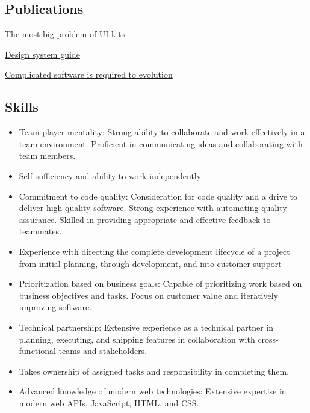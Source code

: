 \documentclass{vitonsky}
\begin{document}
\subsection*{Publications}

\href{https://vitonsky.net/blog/2022/05/23/ui-kit-design/}{The most big problem of UI kits}

\href{https://vitonsky.net/blog/2023/03/18/design-system-guide/}{Design system guide}

\href{https://vitonsky.net/blog/2022/06/08/complicated-software/}{Complicated software is required to evolution}

\subsection*{Skills}

\begin{itemize}
\item
  Team player mentality: Strong ability to collaborate and work effectively in a team environment. Proficient in communicating ideas and collaborating with team members.
\item
  Self-sufficiency and ability to work independently
\item
  Commitment to code quality: Consideration for code quality and a drive to deliver high-quality software. Strong experience with automating quality assurance. Skilled in providing appropriate and effective feedback to teammates.
\item
  Experience with directing the complete development lifecycle of a project from initial planning, through development, and into customer support
\item
  Prioritization based on business goals: Capable of prioritizing work based on business objectives and tasks. Focus on customer value and iteratively improving software.
\item
  Technical partnership: Extensive experience as a technical partner in planning, executing, and shipping features in collaboration with cross-functional teams and stakeholders.
\item
  Takes ownership of assigned tasks and responsibility in completing them.
\item
  Advanced knowledge of modern web technologies: Extensive expertise in modern web APIs, JavaScript, HTML, and CSS.
\end{itemize}
\end{document}
